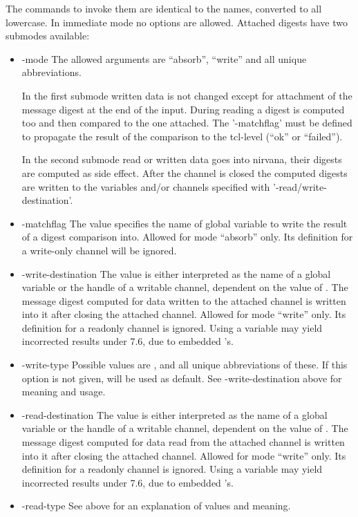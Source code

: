 \documentclass {report}
\begin{document}
The commands to invoke them are identical to the names, converted to
all lowercase. In immediate mode no options are allowed. Attached
digests have two submodes available:

\begin {itemize}
\item [-mode]
	The allowed arguments are ``absorb'', ``write'' and all unique
	abbreviations. 

	In the first submode written data is not changed except for
	attachment of the message digest at the end of the
	input. During reading a digest is computed too and then
	compared to the one attached. The '-matchflag' must be defined
	to propagate the result of the comparison to the tcl-level
	(``ok'' or ``failed'').

	In the second submode read or written data goes into nirvana,
	their digests are computed as side effect. After the channel
	is closed the computed digests are written to the variables
	and/or channels specified with '-read/write-destination'.

\item [-matchflag]
	The value specifies the name of global variable to write the
	result of a digest comparison into. Allowed for mode
	``absorb'' only. Its definition for a write-only channel will
	be ignored. 

\item [-write-destination]
	The value is either interpreted as the name of a global
	variable or the handle of a writable channel, dependent on the
	value of . The message digest computed for
	data written to the attached channel is written into it after
	closing the attached channel. Allowed for mode ``write''
	only. Its definition for a readonly channel is ignored. Using
	a variable may yield incorrected results under \tcl{} 7.6, due
	to embedded \strterm's. 

\item [-write-type]
	Possible values are ,  and
	all unique abbreviations of these. If this option is not
	given,  will be used as default. See \opt
	{-write-destination} above for meaning and usage.

\item [-read-destination]
	The value is either interpreted as the name of a global
	variable or the handle of a writable channel, dependent on the
	value of . The message digest computed for
	data read from the attached channel is written into it after
	closing the attached channel. Allowed for mode ``write''
	only. Its definition for a readonly channel is ignored. Using
	a variable may yield incorrected results under \tcl{} 7.6, due
	to embedded \strterm's.

\item [-read-type]
	See  above for an explanation of values and meaning.
\end   {itemize}
\end{document}

